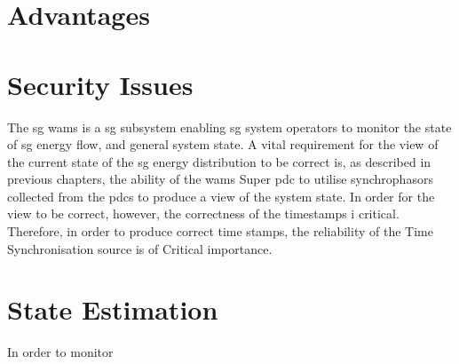 \section{Advantages}
\section{Security Issues}

The \acrfull{sg} \acrfull{wams} is a \acrshort{sg} subsystem enabling \acrshort{sg} system operators to monitor the state of \acrshort{sg} energy flow, and general system state. 
A vital requirement for the view of the current state of the \acrshort{sg} energy distribution to be correct is, as described in previous chapters, the ability of the \acrshort{wams} Super \acrshort{pdc}  to utilise synchrophasors collected from the \acrshort{pdc}s to produce a view of the system state. In order for the view to be correct, however, the correctness of the timestamps i critical.  Therefore, in order to produce correct time stamps, the reliability of the Time Synchronisation source is of Critical importance.


\section{State Estimation}


In order to monitor 


